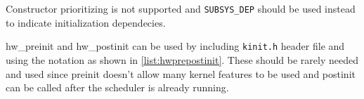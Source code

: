 

Constructor prioritizing is not supported and \verb+SUBSYS_DEP+ should be used
instead to indicate initialization dependecies.

hw\_preinit and hw\_postinit can be used by including \verb+kinit.h+ header file
and using the notation as shown in \ref{list:hwprepostinit}. These should be
rarely needed and used since preinit doesn't allow many kernel features to be
used and postinit can be called after the scheduler is already running.


